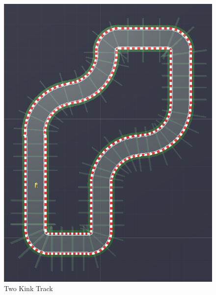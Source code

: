\begin{figure}[H]
\begin{minipage}[b]{0.45\textwidth}
    \includegraphics[width=\textwidth]{images/tracks/EvenMoreComplicatedTrack.PNG}
    \caption{Two Kink Track}
    \label{fig:twokink}
  \end{minipage}
  
\end{figure}
